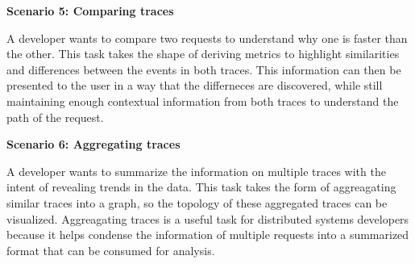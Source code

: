 \textbf{Scenario 5: Comparing traces}

A developer wants to compare two requests to understand why one is faster than the other. This task takes the shape of deriving metrics to highlight
similarities and differences between the events in both traces. This information can then be presented to the user in a way that the differneces are discovered,
while still maintaining enough contextual information from both traces to understand the path of the request.

\textbf{Scenario 6: Aggregating traces}

A developer wants to summarize the information on multiple traces with the intent of revealing trends in the data. This task takes the form of aggreagating similar
traces into a graph, so the topology of these aggregated traces can be visualized. Aggreagating traces is a useful task for distributed systems developers because it helps condense the
information of multiple requests into a summarized format that can be consumed for analysis.